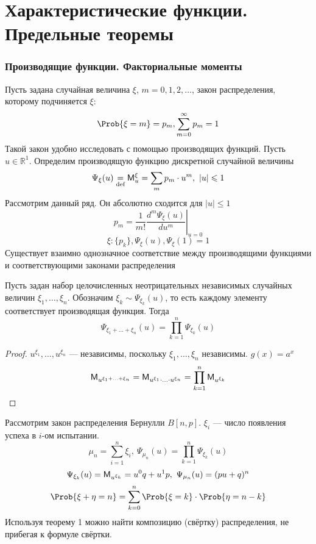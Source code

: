 \part{Характеристические функции. Предельные теоремы}
\setcounter{equation}{0}
\section{Производящие функции. Факториальные моменты}
Пусть задана случайная величина $\xi$, $m = 0, 1, 2, \ldots$, закон распределения, которому подчиняется $\xi$: 
\[
	\Prob \{ \xi = m \} = p_m, \sum\limits_{m = 0}^{\infty} p_m = 1
\]
Такой закон удобно исследовать с помощью производящих функций. Пусть $u \in \mathbb{R}^1$. Определим производящую функцию дискретной случайной величины
\begin{equation}
	\Psi_{\xi} (u) \underset{\textrm{def} }{=} \mathsf{M}_u^{\xi} = \sum\limits_{m} p_m \cdot u^m, \ |u| \leqslant 1
\end{equation}
Рассмотрим данный ряд. Он абсолютно сходится для $|u| \leqslant 1$
\begin{equation}
	p_m = \frac{1}{m!} \left. \frac{d^m \Psi_{\xi} (u)}{du^{m}} \right|_{u = 0}
\end{equation}
\[
	\xi : \{ p_k \}, \Psi_{\xi} (u), \Psi_{\xi}(1) = 1
\]
Существует взаимно однозначное соответствие между производящими функциями и соответствующими законами распределения
\begin{theorem}
	Пусть задан набор целочисленных неотрицательных независимых случайных величин $\xi_1, \ldots, \xi_n$. Обозначим $\xi_k \sim \Psi_{\xi_k} (u)$, то есть каждому элементу соответствует производящая функция. Тогда
\[
	\Psi_{\xi_1 + \ldots + \xi_n} (u) = \prod\limits_{k = 1}^{n} \Psi_{\xi_k} (u)
\]
\end{theorem}
\begin{proof}
	$u^{\xi_1}, \ldots, u^{\xi_n}$ --- независимы, поскольку $\xi_1, \ldots, \xi_n$ независимы. $g(x) = a^x$
\[
	\mathsf{M}_{u^{\xi_1 + \ldots + \xi_n}} = \mathsf{M}_{u^{\xi_1} \cdot \ldots \cdot u^{\xi_n}} = \prod\limits_{k = 1}^{n} \mathsf{M}_{u^{\xi_k}}
\]
\end{proof}
\begin{example}
	Рассмотрим закон распределения Бернулли $B[n, p]$. $\xi_i$ --- число появления успеха в $i$-ом испытании.
\[
	\mu_n = \sum\limits_{i = 1}^{n} \xi_i, \ \Psi_{\mu_n} (u) = \prod\limits_{k = 1}^{n} \Psi_{\xi_k} (u)
\]
\[
	\Psi_{\xi_k} (u) = \mathsf{M}_{u^{\xi_k}} = u^0 q + u^1 p, \ \Psi_{\mu_n} (u) = (pu + q)^n
\]
\[
	\Prob \{ \xi + \eta = n \} = \sum\limits_{k = 0}^{n} \Prob \{ \xi = k \} \cdot \Prob \{ \eta = n - k \}
\]
Используя теорему 1 можно найти композицию (свёртку) распределения, не прибегая к формуле свёртки.
\end{example}
